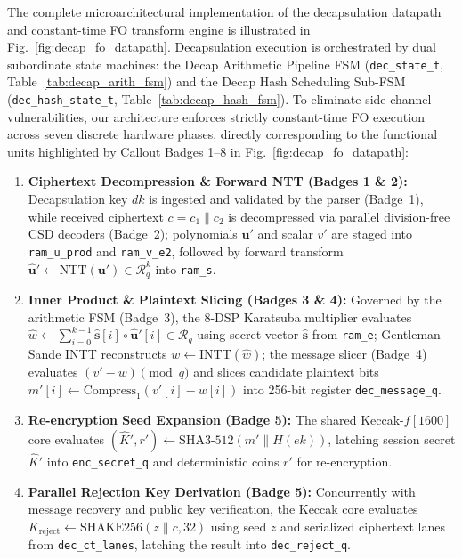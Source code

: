 The complete microarchitectural implementation of the decapsulation datapath and constant-time FO transform engine is illustrated in Fig.~\ref{fig:decap_fo_datapath}. Decapsulation execution is orchestrated by dual subordinate state machines: the Decap Arithmetic Pipeline FSM (\texttt{dec\_state\_t}, Table~\ref{tab:decap_arith_fsm}) and the Decap Hash Scheduling Sub-FSM (\texttt{dec\_hash\_state\_t}, Table~\ref{tab:decap_hash_fsm}). To eliminate side-channel vulnerabilities, our architecture enforces strictly constant-time FO execution across seven discrete hardware phases, directly corresponding to the functional units highlighted by Callout Badges 1--8 in Fig.~\ref{fig:decap_fo_datapath}:
\begin{enumerate}
    \item \textbf{Ciphertext Decompression \& Forward NTT (Badges 1 \& 2):} Decapsulation key $dk$ is ingested and validated by the parser (Badge~1), while received ciphertext $c = c_1 \parallel c_2$ is decompressed via parallel division-free CSD decoders (Badge~2); polynomials $\mathbf{u}'$ and scalar $v'$ are staged into \texttt{ram\_u\_prod} and \texttt{ram\_v\_e2}, followed by forward transform $\hat{\mathbf{u}}' \leftarrow \text{NTT}(\mathbf{u}') \in \mathcal{R}_q^k$ into \texttt{ram\_s}.
    \item \textbf{Inner Product \& Plaintext Slicing (Badges 3 \& 4):} Governed by the arithmetic FSM (Badge~3), the 8-DSP Karatsuba multiplier evaluates $\hat{w} \leftarrow \sum_{i=0}^{k-1} \hat{\mathbf{s}}[i] \circ \hat{\mathbf{u}}'[i] \in \mathcal{R}_q$ using secret vector $\hat{\mathbf{s}}$ from \texttt{ram\_e}; Gentleman-Sande INTT reconstructs $w \leftarrow \text{INTT}(\hat{w})$; the message slicer (Badge~4) evaluates $(v' - w) \pmod q$ and slices candidate plaintext bits $m'[i] \leftarrow \text{Compress}_1(v'[i] - w[i])$ into 256-bit register \texttt{dec\_message\_q}.
    \item \textbf{Re-encryption Seed Expansion (Badge 5):} The shared Keccak-$f[1600]$ core evaluates $(\hat{K}', r') \leftarrow \text{SHA3-512}(m' \parallel H(ek))$, latching session secret $\hat{K}'$ into \texttt{enc\_secret\_q} and deterministic coins $r'$ for re-encryption.
    \item \textbf{Parallel Rejection Key Derivation (Badge 5):} Concurrently with message recovery and public key verification, the Keccak core evaluates $K_{\text{reject}} \leftarrow \text{SHAKE256}(z \parallel c, 32)$ using seed $z$ and serialized ciphertext lanes from \texttt{dec\_ct\_lanes}, latching the result into \texttt{dec\_reject\_q}.

\end{enumerate}
